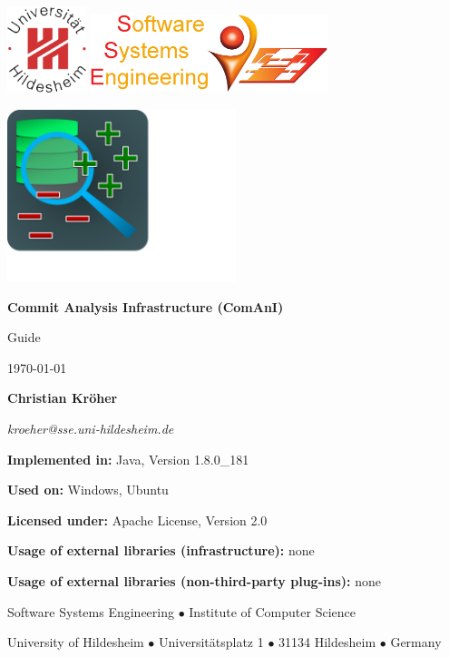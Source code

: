 \begin{titlepage}
\centering

{\includegraphics[height=2.5cm]{inserts/suh_logo.jpg} \hfill \includegraphics[height=2.3cm]{inserts/sse_logo.png}}\par\vspace{3cm}
\includegraphics[height=5cm,trim={0cm 3,4cm 9,7cm 0cm},clip]{inserts/comani_logo.pdf}\par\vspace{1cm}
{\Huge \textbf{Commit Analysis Infrastructure \newline (ComAnI)}}\par\vspace{1.5cm}
{\Huge Guide}\par\vspace{5mm}
{\Large \today}\par\vspace{1.5cm}
{\Large \textbf{Christian Kröher}}\par
{\Large \textit{kroeher@sse.uni-hildesheim.de}}\par\vspace{1.5cm}
{\textbf{Implemented in:} Java, Version 1.8.0\_181}\par
{\textbf{Used on:} Windows, Ubuntu}\par
{\textbf{Licensed under:} Apache License, Version 2.0}\par
{\textbf{Usage of external libraries (infrastructure):} none}\par
{\textbf{Usage of external libraries (non-third-party plug-ins):} none}\par
\vfill
{Software Systems Engineering $\bullet$ Institute of Computer Science}\par
{University of Hildesheim $\bullet$ Universit\"atsplatz 1 $\bullet$ 31134 Hildesheim $\bullet$ Germany}\par
\end{titlepage}
